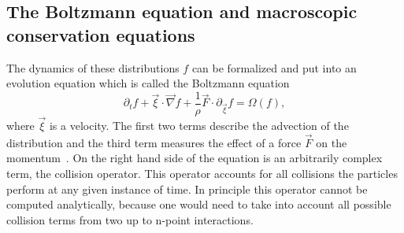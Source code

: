 \subsection{The Boltzmann equation and macroscopic conservation equations}
The dynamics of these distributions $f$ can be formalized and put into an evolution equation which is called the Boltzmann equation
\begin{equation}\label{eq:boltzmann_eq}
    \partial_t f + \vec{\xi}\cdot\vec{\nabla} f + \frac{1}{\rho}\vec{F}\cdot\partial_{\vec{\xi}}f = \Omega(f), 
\end{equation}
where $\vec{\xi}$ is a velocity. 
The first two terms describe the advection of the distribution and the third term measures the effect of a force $\vec{F}$ on the momentum~\cite{krugerLatticeBoltzmannMethod2017}.
On the right hand side of the equation is an arbitrarily complex term, the collision operator.
This operator accounts for all collisions the particles perform at any given instance of time.
In principle this operator cannot be computed analytically, because one would need to take into account all possible collision terms from two up to n-point interactions.

